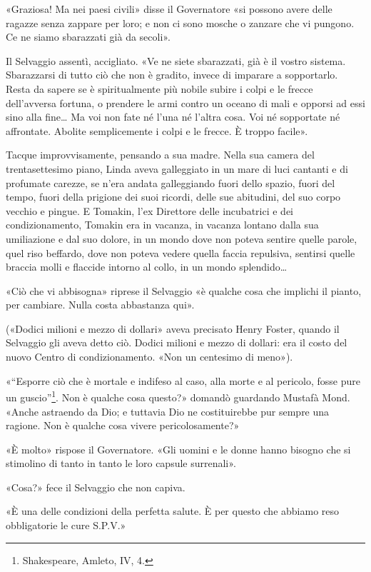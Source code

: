 \documentclass[
a5paper, %
10pt, %
twoside, 
onecolumn, %
openany, %
]{memoir}
\begin{document}
«Graziosa! Ma nei paesi civili» disse il Governatore «si possono avere delle ragazze senza zappare per loro; e non ci sono mosche o zanzare che vi pungono. Ce ne siamo sbarazzati già da secoli».

Il Selvaggio assentì, accigliato. «Ve ne siete sbarazzati, già è il vostro sistema. Sbarazzarsi di tutto ciò che non è gradito, invece di imparare a sopportarlo. Resta da sapere se è spiritualmente più nobile subire i colpi e le frecce dell’avversa fortuna, o prendere le armi contro un oceano di mali e opporsi ad essi sino alla fine… Ma voi non fate né l’una né l’altra cosa. Voi né sopportate né affrontate. Abolite semplicemente i colpi e le frecce. È troppo facile».

Tacque improvvisamente, pensando a sua madre. Nella sua camera del trentasettesimo piano, Linda aveva galleggiato in un mare di luci cantanti e di profumate carezze, se n’era andata galleggiando fuori dello spazio, fuori del tempo, fuori della prigione dei suoi ricordi, delle sue abitudini, del suo corpo vecchio e pingue. E Tomakin, l’ex Direttore delle incubatrici e dei condizionamento, Tomakin era in vacanza, in vacanza lontano dalla sua umiliazione e dal suo dolore, in un mondo dove non poteva sentire quelle parole, quel riso beffardo, dove non poteva vedere quella faccia repulsiva, sentirsi quelle braccia molli e flaccide intorno al collo, in un mondo splendido…

«Ciò che vi abbisogna» riprese il Selvaggio «è qualche cosa che implichi il pianto, per cambiare. Nulla costa abbastanza qui».

(«Dodici milioni e mezzo di dollari» aveva precisato Henry Foster, quando il Selvaggio gli aveva detto ciò. Dodici milioni e mezzo di dollari: era il costo del nuovo Centro di condizionamento. «Non un centesimo di meno»).

«“Esporre ciò che è mortale e indifeso al caso, alla morte e al pericolo, fosse pure un guscio”\footnote{Shakespeare, Amleto, IV, 4.}. Non è qualche cosa questo?» domandò guardando Mustafà Mond. «Anche astraendo da Dio; e tuttavia Dio ne costituirebbe pur sempre una ragione. Non è qualche cosa vivere pericolosamente?»

«È molto» rispose il Governatore. «Gli uomini e le donne hanno bisogno che si stimolino di tanto in tanto le loro capsule surrenali».

«Cosa?» fece il Selvaggio che non capiva.

«È una delle condizioni della perfetta salute. È per questo che abbiamo reso obbligatorie le cure S.P.V.»
\end{document}
